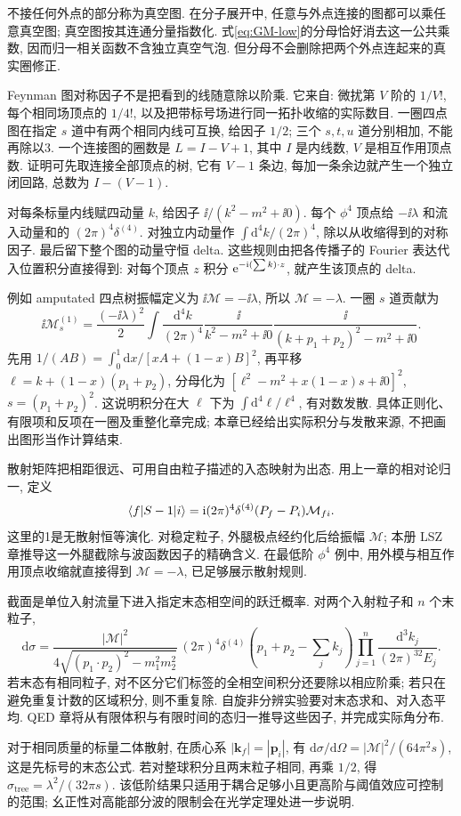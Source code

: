 不接任何外点的部分称为真空图. 在分子展开中, 任意与外点连接的图都可以乘任意真空图; 真空图按其连通分量指数化. 式\eqref{eq:GM-low}的分母恰好消去这一公共乘数, 因而归一相关函数不含独立真空气泡. 但分母不会删除把两个外点连起来的真实圈修正.

Feynman 图对称因子不是把看到的线随意除以阶乘. 它来自: 微扰第 $V$ 阶的 $1/V!$, 每个相同场顶点的 $1/4!$, 以及把带标号场进行同一拓扑收缩的实际数目. 一圈四点图在指定 $s$ 道中有两个相同内线可互换, 给因子 $1/2$; 三个 $s,t,u$ 道分别相加, 不能再除以3. 一个连接图的圈数是 $L=I-V+1$, 其中 $I$ 是内线数, $V$ 是相互作用顶点数. 证明可先取连接全部顶点的树, 它有 $V-1$ 条边, 每加一条余边就产生一个独立闭回路, 总数为 $I-(V-1)$.

对每条标量内线赋四动量 $k$, 给因子 $\ii/(k^2-m^2+\ii0)$. 每个 $\phi^4$ 顶点给 $-\ii\lambda$ 和流入动量和的 $(2\pi)^4\delta^{(4)}$. 对独立内动量作 $\int\mathrm d^4k/(2\pi)^4$, 除以从收缩得到的对称因子. 最后留下整个图的动量守恒 delta. 这些规则由把各传播子的 Fourier 表达代入位置积分直接得到: 对每个顶点 $z$ 积分 $\mathrm e^{-\mathrm i(\sum k)\cdot z}$, 就产生该顶点的 delta.

例如 amputated 四点树振幅定义为 $\ii\mathcal M=-\ii\lambda$, 所以 $\mathcal M=-\lambda$. 一圈 $s$ 道贡献为
\[
\ii\mathcal M_s^{(1)}=\frac{(-\ii\lambda)^2}{2}
\int\frac{\mathrm d^4k}{(2\pi)^4}
\frac\ii{k^2-m^2+\ii0}\frac\ii{(k+p_1+p_2)^2-m^2+\ii0}.
\]
先用 $1/(AB)=\int_0^1\mathrm dx/[xA+(1-x)B]^2$, 再平移 $\ell=k+(1-x)(p_1+p_2)$, 分母化为 $[\ell^2-m^2+x(1-x)s+\ii0]^2$, $s=(p_1+p_2)^2$. 这说明积分在大 $\ell$ 下为 $\int\mathrm d^4\ell/\ell^4$, 有对数发散. 具体正则化、有限项和反项在一圈及重整化章完成; 本章已经给出实际积分与发散来源, 不把画出图形当作计算结束.

散射矩阵把相距很远、可用自由粒子描述的入态映射为出态. 用上一章的相对论归一, 定义
\[
\langle f\rvert S-1\lvert i\rangle=\mathrm i(2\pi)^4\delta^{(4)}(P_f-P_i)\mathcal M_{fi}.
\]
这里的1是无散射恒等演化. 对稳定粒子, 外腿极点经约化后给振幅 $\mathcal M$; 本册 LSZ 章推导这一外腿截除与波函数因子的精确含义. 在最低阶 $\phi^4$ 例中, 用外模与相互作用顶点收缩就直接得到 $\mathcal M=-\lambda$, 已足够展示散射规则.

截面是单位入射流量下进入指定末态相空间的跃迁概率. 对两个入射粒子和 $n$ 个末粒子,
\[
\mathrm d\sigma=\frac{|\mathcal M|^2}{4\sqrt{(p_1\cdot p_2)^2-m_1^2m_2^2}}\,
(2\pi)^4\delta^{(4)}\!\left(p_1+p_2-\sum_jk_j\right)
\prod_{j=1}^n\frac{\mathrm d^3k_j}{(2\pi)^32E_j}.
\]
若末态有相同粒子, 对不区分它们标签的全相空间积分还要除以相应阶乘; 若只在避免重复计数的区域积分, 则不重复除. 自旋非分辨实验要对末态求和、对入态平均. QED 章将从有限体积与有限时间的态归一推导这些因子, 并完成实际角分布.

对于相同质量的标量二体散射, 在质心系 $|\mathbf k_f|=|\mathbf p_i|$, 有 $\mathrm d\sigma/\mathrm d\Omega=|\mathcal M|^2/(64\pi^2s)$, 这是先标号的末态公式. 若对整球积分且两末粒子相同, 再乘 $1/2$, 得 $\sigma_{\mathrm{tree}}=\lambda^2/(32\pi s)$. 该低阶结果只适用于耦合足够小且更高阶与阈值效应可控制的范围; 幺正性对高能部分波的限制会在光学定理处进一步说明.
